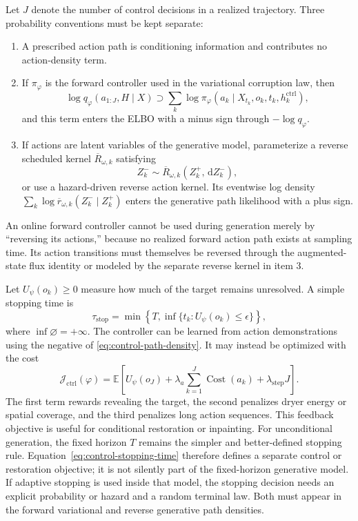 \documentclass[10pt]{article}
\theoremstyle{definition}
\theoremstyle{remark}
\newcommand{\E}{\mathbb{E}}
\newcommand{\dd}{\,\mathrm{d}}
\begin{document}
Let $J$ denote the number of control decisions in a realized trajectory.
Three probability conventions must be kept separate:
\begin{enumerate}
  \item A prescribed action path is conditioning information and contributes
  no action-density term.
  \item If $\pi_\varphi$ is the forward controller used in the variational
  corruption law, then
  \begin{equation}
    \log q_\varphi(a_{1:J},H\mid X)
    \supset
    \sum_k\log\pi_\varphi
    (a_k\mid X_{t_k},o_k,t_k,h_k^{\mathrm{ctrl}}),
    \label{eq:control-path-density}
  \end{equation}
  and this term enters the ELBO with a minus sign through $-\log q_\varphi$.
  \item If actions are latent variables of the generative model, parameterize
  a reverse scheduled kernel $\overline R_{\omega,k}$ satisfying
  \begin{equation*}
    Z_k^-\sim\overline R_{\omega,k}(Z_k^+,\dd Z_k^-),
  \end{equation*}
  or use a hazard-driven reverse action kernel.  Its eventwise log density
  $\sum_k\log\overline r_{\omega,k}(Z_k^-\mid Z_k^+)$ enters the generative
  path likelihood with a plus sign.
\end{enumerate}
An online forward controller cannot be used during generation merely by
``reversing its actions,'' because no realized forward action path exists at
sampling time.  Its action transitions must themselves be reversed through
the augmented-state flux identity or modeled by the separate reverse kernel
in item 3.

Let $U_\psi(o_k)\geq0$ measure how much of the target remains unresolved.
A simple stopping time is
\begin{equation}
  \tau_{\mathrm{stop}}
  =\min\!\left\{T,\inf\{t_k:U_\psi(o_k)\leq\epsilon\}\right\},
  \label{eq:control-stopping-time}
\end{equation}
where $\inf\varnothing=+\infty$.
The controller can be learned from action demonstrations using the negative
of \eqref{eq:control-path-density}.  It may instead be optimized with the
cost
\begin{equation}
  \mathcal J_{\mathrm{ctrl}}(\varphi)
  =\E\!\left[
    U_\psi(o_J)
    +\lambda_a\sum_{k=1}^{J}\operatorname{Cost}(a_k)
    +\lambda_{\mathrm{step}}J
  \right].
  \label{eq:control-objective}
\end{equation}
The first term rewards revealing the target, the second penalizes dryer
energy or spatial coverage, and the third penalizes long action sequences.
This feedback objective is useful for conditional restoration or inpainting.
For unconditional generation, the fixed horizon $T$ remains the simpler and
better-defined stopping rule.  Equation~\eqref{eq:control-stopping-time}
therefore defines a separate control or restoration objective; it is not
silently part of the fixed-horizon generative model.  If adaptive stopping is
used inside that model, the stopping decision needs an explicit probability
or hazard and a random terminal law.  Both must appear in the forward
variational and reverse generative path densities.
\end{document}
